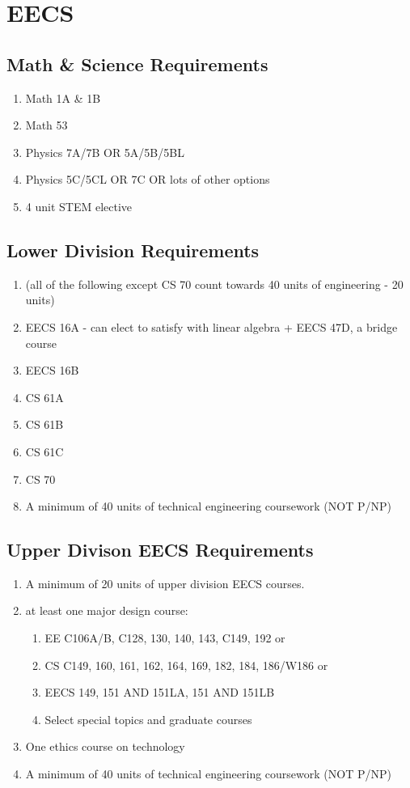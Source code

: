 \section{EECS}

\subsection{Math \& Science Requirements}

\begin{enumerate}
    \item Math 1A \& 1B
    \item Math 53
    \item Physics 7A/7B OR 5A/5B/5BL
    \item Physics 5C/5CL OR 7C OR lots of other options
    \item 4 unit STEM elective
\end{enumerate}

\subsection{Lower Division Requirements}

\begin{enumerate}
    \item (all of the following except CS 70 count towards 40 units of engineering - 20 units)
    \item EECS 16A - can elect to satisfy with linear algebra + EECS 47D, a bridge course
    \item EECS 16B
    \item CS 61A
    \item CS 61B
    \item CS 61C
    \item CS 70
    \item A minimum of 40 units of technical engineering coursework (NOT P/NP)
\end{enumerate}

\subsection{Upper Divison EECS Requirements}

\begin{enumerate}
    \item A minimum of 20 units of upper division EECS courses.
    \item at least one major design course:
    \begin{enumerate}
        \item EE C106A/B, C128, 130, 140, 143, C149, 192 or
        \item CS C149, 160, 161, 162, 164, 169, 182, 184, 186/W186 or
        \item EECS 149, 151 AND 151LA, 151 AND 151LB
        \item Select special topics and graduate courses
    \end{enumerate}
    \item One ethics course on technology
    \item A minimum of 40 units of technical engineering coursework (NOT P/NP)
\end{enumerate}